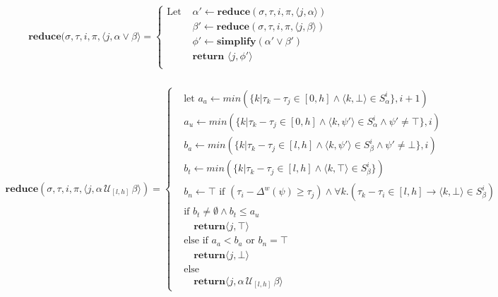 \documentclass[10pt,a4paper]{article}
\newcommand{\rp}[2]{\ensuremath{\langle #1, #2 \rangle}}
\begin{document}
\begin{align*}
\mathbf{reduce}(\sigma,\tau, i,\pi,\rp{j}{\alpha \vee \beta} = \left\{
\begin{aligned}
\text{Let } &\alpha' \leftarrow \mathbf{reduce}(\sigma, \tau, i, \pi, \rp{j}{\alpha}) \\
&\beta' \leftarrow \mathbf{reduce}(\sigma, \tau, i, \pi, \rp{j}{\beta}) \\
&\phi' \leftarrow \mathbf{simplify}(\alpha' \vee \beta') \\
&\textbf{return } \rp{j}{\phi'} \\
\end{aligned} \right. \\
\end{align*}

\begin{align*}
\mathbf{reduce}(\sigma,\tau, i,\pi,\rp{j}{\alpha\, \mathcal{U}_{[l,h]}\, \beta}) = \left\{
\begin{aligned}
&\text{let } a_a \leftarrow min(\{k | \tau_k - \tau_j \in [0, h] \wedge \rp{k}{\bot} \in S^i_{\alpha} \}, i+1)  \\
&a_u \leftarrow min(\{k | \tau_k - \tau_j \in [0, h] \wedge  \rp{k}{\psi'} \in S^i_{\alpha} \wedge \psi' \neq \top \}, i) \\
&b_a \leftarrow min(\{k | \tau_k - \tau_j \in [l, h] \wedge \rp{k}{\psi'} \in S^i_{\beta} \wedge \psi' \neq \bot \}, i)  \\
&b_t \leftarrow min(\{k | \tau_k - \tau_j \in [l, h] \wedge \rp{k}{\top} \in S^i_{\beta} \}) \\
&b_n \leftarrow \top \text{ if } (\tau_i - \Delta^w(\psi) \geq \tau_j) \wedge \forall k.(\tau_k - \tau_i \in [l,h] \rightarrow \rp{k}{\bot} \in S^i_{\beta}) \\
&\text{if }b_t \neq \emptyset \wedge b_t \leq a_u \\
& \quad\mathbf{return} \rp{j}{\top} \\
&\text{else if } a_a < b_a \text{ or } b_n = \top\\ & \quad\mathbf{return} \rp{j}{\bot} \\
&\text{else} \\
& \quad\mathbf{return} \rp{j}{\alpha\, \mathcal{U}_{[l,h]}\, \beta}
\end{aligned} \right. \\
\end{align*}

\end{document}
